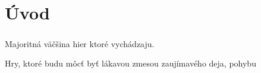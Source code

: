\chapter{Úvod}
\paragraph{}

Majoritná väčšina hier ktoré vychádzaju.

Hry, ktoré budu môcť byť lákavou zmesou zaujímavého deja, pohybu
